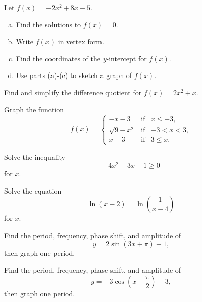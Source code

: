 \documentclass[12pt]{amsart}
\begin{document}
\begin{thm}
  Let $f(x) =  -2x^2 + 8x - 5$.
  \begin{enumerate}[(a)]
  \item
    Find the solutions to $f(x) = 0$.
    \vspace{2in}
  \item
    Write $f(x)$ in vertex form.
    \vspace{2in}
  \item
    Find the coordinates of the $y$-intercept for $f(x)$.
    \vspace{2in}
  \item
    Use parts (a)-(c) to sketch a graph of $f(x)$.
  \end{enumerate}
\end{thm}

\newpage

\begin{thm}
    Find and simplify the difference quotient for $f(x) = 2x^2 + x$.
\end{thm}

\newpage

\begin{thm}
  Graph the function
  $$f(x) = \left\{
  \begin{array}{ccc}
    -x - 3 & \text{if} & x \leq -3,\\
    \sqrt{9 - x^2} & \text{if} & -3 < x < 3,\\
    x - 3 & \text{if} & 3 \leq x.
  \end{array}
  \right.
  $$
\end{thm}

\newpage

\begin{thm}
  Solve the inequality
  $$-4x^2 + 3x + 1 \geq 0$$
  for $x$.
\end{thm}

\newpage

\begin{thm}
  Solve the equation
  $$\ln(x - 2) = \ln\left(\frac{1}{x - 4}\right)$$
  for $x$.
\end{thm}
\newpage

\begin{thm}
  Find the period, frequency, phase shift, and amplitude of $$y = 2\sin(3x + \pi) + 1,$$ then graph one period.
\end{thm}

\newpage

\begin{thm}
  Find the period, frequency, phase shift, and amplitude of $$y = -3\cos\left(x - \frac{\pi}{2}\right) - 3,$$ then graph one period.
\end{thm}
\end{document}
